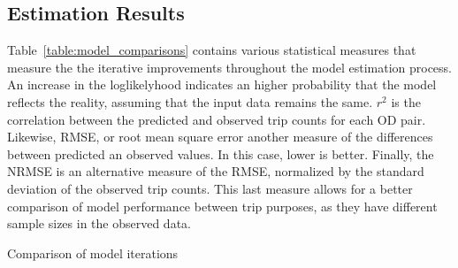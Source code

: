 \subsection{Estimation Results}
Table~\ref{table:model_comparisons} contains various statistical measures that measure the the iterative improvements throughout the model estimation process. An increase in the loglikelyhood indicates an higher probability that the model reflects the reality, assuming that the input data remains the same. $r^2$ is the correlation between the predicted and observed trip counts for each OD pair. Likewise, RMSE, or root mean square error another measure of the differences between predicted an observed values. In this case, lower is better. Finally, the NRMSE is an alternative measure of the RMSE, normalized by the standard deviation of the observed trip counts. This last measure allows for a better comparison of model performance between trip purposes, as they have different sample sizes in the observed data. 

\begin{table}[H]
\centering
\caption{Comparison of model iterations}
\label{table:model_comparisons}


\end{table}

